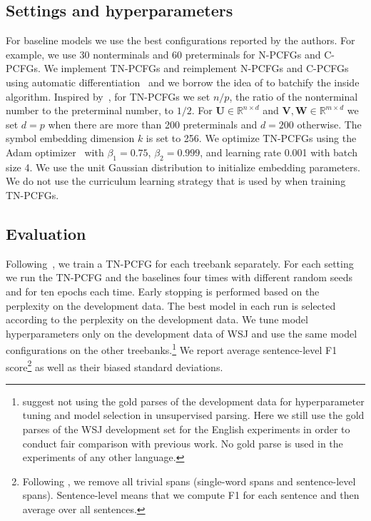 \documentclass[11pt]{article}
\begin{document}
\subsection{Settings and hyperparameters}
For baseline models we use the best configurations reported by the authors.
For example, we use 30 nonterminals and 60 preterminals for N-PCFGs and C-PCFGs.
We implement TN-PCFGs and reimplement N-PCFGs and C-PCFGs using automatic differentiation~\citep{eisner-2016-inside} and we borrow the idea of \citet{ijcai2020-560} to batchify the inside algorithm.
Inspired by~\citet{kim-etal-2019-compound},
for TN-PCFGs we set $n / p$, the ratio of the nonterminal number to the preterminal number, to $1 / 2$.
For $\mathbf{U}\in\mathbb{R}^{n\times d}$ and $\mathbf{V}, \mathbf{W}\in\mathbb{R}^{m\times d}$ we set $d=p$ when there are more than 200 preterminals and $d=200$ otherwise. The symbol embedding dimension $k$ is set to 256.
We optimize TN-PCFGs using the Adam optimizer~\citep{kingma2014adam} with $\beta_1 = 0.75$, $\beta_2 = 0.999$, and learning rate 0.001 with batch size 4. We use the unit Gaussian distribution to initialize embedding parameters. We do not use the curriculum learning strategy that is used by \citet{kim-etal-2019-compound} when training TN-PCFGs.


\subsection{Evaluation}
Following~\citet{kim-etal-2019-compound}, we train a TN-PCFG for each treebank separately.
For each setting we run the TN-PCFG and the baselines four times with different random seeds and for ten epochs each time.
Early stopping is performed based on the perplexity on the development data.
The best model in each run is selected according to the perplexity on the development data.
We tune model hyperparameters only on the development data of WSJ and use the same model configurations on the other treebanks.\footnote{
\citet{shi-etal-2020-role} suggest not using the gold parses of the development data for hyperparameter tuning and model selection in unsupervised parsing.
Here we still use the gold parses of the WSJ development set for the English experiments in order to conduct fair comparison with previous work. No gold parse is used in the experiments of any other language.
}
We report average sentence-level F1 score\footnote{Following \citet{kim-etal-2019-compound}, we remove all trivial spans (single-word spans and sentence-level spans). Sentence-level means that we compute F1 for each sentence and then average over all sentences. } as well as their biased standard deviations.
\end{document}
